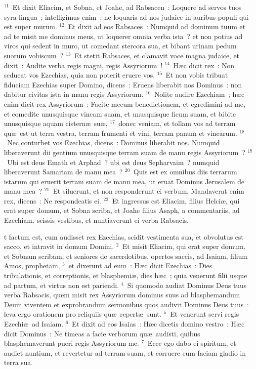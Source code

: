 ${}^{11}$~Et dixit Eliacim, et Sobna, et Joahe, ad Rabsacen~: Loquere ad servos tuos syra lingua~; intelligimus enim~; ne loquaris ad nos judaice in auribus populi qui est super murum.
${}^{12}$~Et dixit ad eos Rabsaces~: Numquid ad dominum tuum et ad te misit me dominus meus, ut loquerer omnia verba ista~? et non potius ad viros qui sedent in muro, ut comedant stercora sua, et bibant urinam pedum suorum vobiscum~?
${}^{13}$~Et stetit Rabsaces, et clamavit voce magna judaice, et dixit~: Audite verba regis magni, regis Assyriorum~!
${}^{14}$~H\ae c dicit rex~: Non seducat vos Ezechias, quia non poterit eruere vos.
${}^{15}$~Et non vobis tribuat fiduciam Ezechias super Domino, dicens~: Eruens liberabit nos Dominus~: non dabitur civitas ista in manu regis Assyriorum.
${}^{16}$~Nolite audire Ezechiam~; h\ae c enim dicit rex Assyriorum~: Facite mecum benedictionem, et egredimini ad me, et comedite unusquisque vineam suam, et unusquisque ficum suam, et bibite unusquisque aquam cistern\ae\ su\ae ,
${}^{17}$~donec veniam, et tollam vos ad terram qu\ae\ est ut terra vestra, terram frumenti et vini, terram panum et vinearum.
${}^{18}$~Nec conturbet vos Ezechias, dicens~: Dominus liberabit nos. Numquid liberaverunt dii gentium unusquisque terram suam de manu regis Assyriorum~?
${}^{19}$~Ubi est deus Emath et Arphad~? ubi est deus Sepharvaim~? numquid liberaverunt Samariam de manu mea~?
${}^{20}$~Quis est ex omnibus diis terrarum istarum qui eruerit terram suam de manu mea, ut eruat Dominus Jerusalem de manu mea~?
${}^{21}$~Et siluerunt, et non responderunt ei verbum. Mandaverat enim rex, dicens~: Ne respondeatis ei.
${}^{22}$~Et ingressus est Eliacim, filius Helci\ae , qui erat super domum, et Sobna scriba, et Joahe filius Asaph, a commentariis, ad Ezechiam, scissis vestibus, et nuntiaverunt ei verba Rabsacis.

\bchapter
{}t factum est, cum audisset rex Ezechias, scidit vestimenta sua, et obvolutus est sacco, et intravit in domum Domini.
${}^{2}$~Et misit Eliacim, qui erat super domum, et Sobnam scribam, et seniores de sacerdotibus, opertos saccis, ad Isaiam, filium Amos, prophetam,
${}^{3}$~et dixerunt ad eum~: H\ae c dicit Ezechias~: Dies tribulationis, et correptionis, et blasphemi\ae , dies h\ae c~; quia venerunt filii usque ad partum, et virtus non est pariendi.
${}^{4}$~Si quomodo audiat Dominus Deus tuus verba Rabsacis, quem misit rex Assyriorum dominus suus ad blasphemandum Deum viventem et exprobrandum sermonibus quos audivit Dominus Deus tuus~: leva ergo orationem pro reliquiis qu\ae\ repert\ae\ sunt.
${}^{5}$~Et venerunt servi regis Ezechi\ae\ ad Isaiam.
${}^{6}$~Et dixit ad eos Isaias~: H\ae c dicetis domino vestro~: H\ae c dicit Dominus~: Ne timeas a facie verborum qu\ae\ audisti, quibus blasphemaverunt pueri regis Assyriorum me.
${}^{7}$~Ecce ego dabo ei spiritum, et audiet nuntium, et revertetur ad terram suam, et corruere eum faciam gladio in terra sua.


